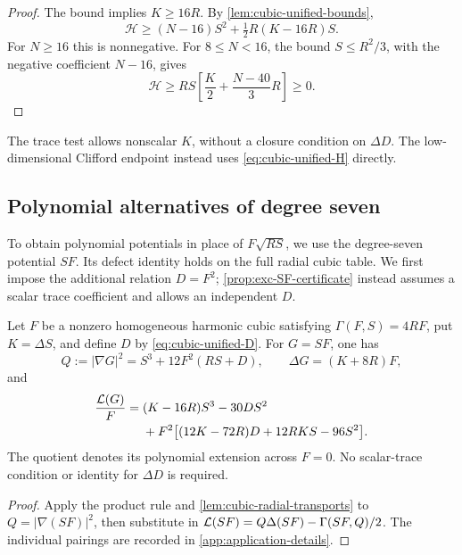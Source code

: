 \begin{proof}
The bound implies \(K\ge16R\). By
\cref{lem:cubic-unified-bounds},
\[
 \mathscr H\ge(N-16)S^2+\tfrac12R(K-16R)S.
\]
For \(N\ge16\) this is nonnegative. For \(8\le N<16\), the bound
\(S\le R^2/3\), with the negative coefficient \(N-16\), gives
\[
 \mathscr H\ge RS\left[\frac K2+\frac{N-40}{3}R\right]\ge0.
\]
\end{proof}

The trace test allows nonscalar \(K\), without a closure condition
on \(\Delta D\). The low-dimensional Clifford endpoint instead uses
\eqref{eq:cubic-unified-H} directly.

\subsection{Polynomial alternatives of degree seven}
\label{sec:cubic-algebraic-existence}

To obtain polynomial potentials in place of \(F\sqrt{RS}\), we use
the degree-seven potential \(SF\). Its defect identity holds on the full
radial cubic table. We first impose the additional relation \(D=F^2\);
\cref{prop:exc-SF-certificate} instead assumes a scalar trace coefficient
and allows an independent \(D\).

\begin{lemma}
\label{lem:cubic-SF-defect}
Let \(F\) be a nonzero homogeneous harmonic cubic satisfying
\(\Gamma(F,S)=4RF\), put \(K=\Delta S\), and define \(D\) by
\eqref{eq:cubic-unified-D}.
For \(G=SF\), one has
\begin{equation}\label{eq:cubic-SF-general-gradient}
 Q:=|\nabla G|^2=S^3+12F^2(RS+D),\qquad
 \Delta G=(K+8R)F,
\end{equation}
and
\begin{equation}\label{eq:cubic-SF-general-defect}
 \begin{aligned}
 \frac{\mathcal L(G)}F={}&(K-16R)S^3-30DS^2\\
   &+F^2\bigl[(12K-72R)D+12RKS-96S^2\bigr].
 \end{aligned}
\end{equation}
The quotient denotes its polynomial extension across \(F=0\).
No scalar-trace condition or identity for \(\Delta D\) is required.
\end{lemma}

\begin{proof}
Apply the product rule and \cref{lem:cubic-radial-transports} to
\(Q=|\nabla(SF)|^2\), then substitute in
\(\mathcal L(SF)=Q\Delta(SF)-\Gamma(SF,Q)/2\).
The individual pairings are recorded in \cref{app:application-details}.
\end{proof}

